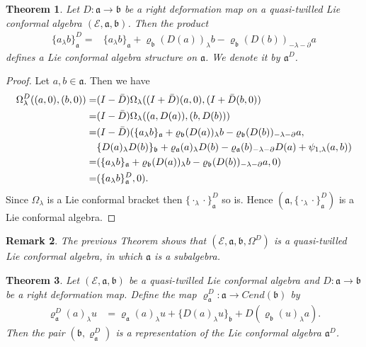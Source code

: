 \documentclass[a4paper,11pt]{article}
\def\Ep{\mathcal{E}}
\def\Vs{\mathfrak{a}}
\def\Ws{\mathfrak{b}}
\def\rep{\varrho}
\def\la{\lambda}
\def\p{\partial}
\numberwithin{equation}{section}
\newtheorem{theorem}{Theorem}[section]
\newtheorem{remark}[theorem]{Remark}
\begin{document}
\begin{theorem}
Let $D: \Vs \to \Ws$ be a right deformation map on a quasi-twilled Lie conformal algebra $(\Ep,\Vs,\Ws)$. Then the product 
\begin{align}
 \{a_\la b\}^D_\Vs
  =&  \{a_\la b\}_\Vs + \rep_\Ws(D(a))_\la b - \rep_\Ws(D(b))_{-\la-\p}a  \label{eq:induced-bracket-I}   
\end{align}
defines  a Lie conformal algebra structure on $\Vs$. We denote it by $\Vs^D$. 
\end{theorem}

\begin{proof}
Let $a,b \in \Vs$. Then we have 
\begin{align*}
\Omega^D_\lambda((a,0) ,(b,0))=& (I-\Bar{D})\Omega_\lambda((I+\Bar{D})(a,0), (I+\Bar{D}(b,0))\\
=& (I-\Bar{D})\Omega_\lambda((a,D(a)),(b,D(b))) \\
=& (I-\Bar{D}) (
    \{a_\la b\}_\Vs + \rep_\Ws(D(a))_\la b
       - \rep_\Ws(D(b))_{-\la-\p}a,\\
    &\{D(a)_\la D(b)\}_\Ws + \rep_\Vs(a)_\la D(b)
       - \rep_\Vs(b)_{-\la-\p}D(a) + \psi_{1,\la}(a,b)) \\
=&( \{a_\la b\}_\Vs + \rep_\Ws(D(a))_\la b
       - \rep_\Ws(D(b))_{-\la-\p}a, 0) \\
=& (\{a_\la b\}^D_\Vs, 0).          
\end{align*}
Since $\Omega_\la$ is a Lie conformal bracket then $\{\cdot_\la \cdot\}^D_\Vs$ so is. Hence $(\Vs,\{\cdot_\la \cdot\}^D_\Vs)$ is a Lie conformal algebra. 
\end{proof}

\begin{remark}
The previous Theorem shows that $(\Ep,\Vs,\Ws,\Omega^D)$ is a quasi-twilled Lie conformal algebra, in which $\Vs$ is a subalgebra.      
\end{remark}

\begin{theorem}
Let $(\Ep,\Vs,\Ws)$ be a quasi-twilled Lie conformal algebra and $D: \Vs \to \Ws$ be a right deformation map. Define the map $\rep^D_\Vs: \Vs \to Cend(\Ws)$ by
\begin{align}
 \rep^D_\Vs(a)_\la u
  &= \rep_\Vs(a)_\la u + \{D(a)_\la u\}_\Ws + D(\rep_\Ws(u)_\la a). \label{eq:induced-rep-I}    
\end{align}
Then the pair $(\Ws, \rep^D_\Vs)$ is a representation of the Lie conformal algebra $\Vs^D$. 
\end{theorem}
\end{document}
